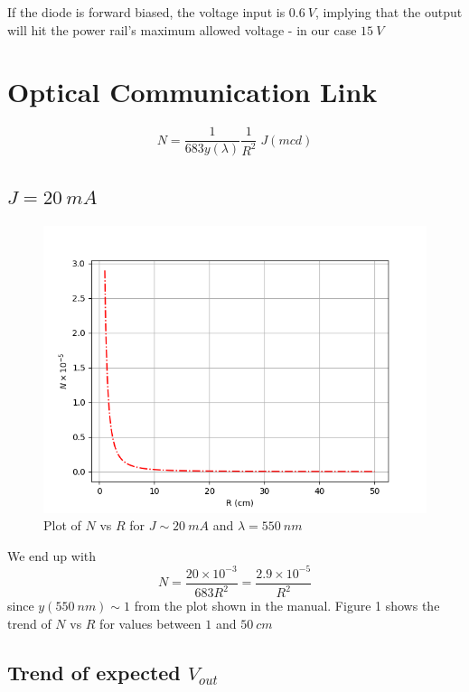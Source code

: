 \documentclass[english]{article}
\begin{document}
If the diode is forward biased, the voltage input is $0.6\ V$, implying
that the output will hit the power rail's maximum allowed voltage
- in our case $15\ V$

\section{Optical Communication Link}

\[
N=\frac{1}{683y\left(\lambda\right)}\frac{1}{R^{2}}\;J\left(mcd\right)
\]

\subsection{$J=20\ mA$}

\begin{figure}
\begin{centering}
\includegraphics[scale=0.5]{plots/NvR}
\par\end{centering}
\caption{Plot of $N$ vs $R$ for $J\sim20\ mA$ and $\lambda=550\ nm$}
\end{figure}
We end up with 
\[
N=\frac{20\times10^{-3}}{683R^{2}}=\frac{2.9\times10^{-5}}{R^{2}}
\]
since $y\left(550\ nm\right)\sim1$ from the plot shown in the manual.
Figure 1 shows the trend of $N$ vs $R$ for values between $1$ and
$50\ cm$

\subsection{Trend of expected $V_{out}$}
\end{document}
